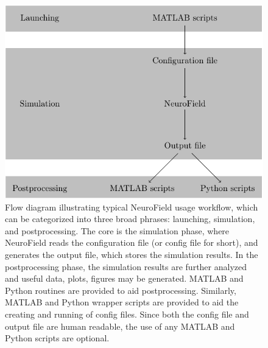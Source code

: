 \documentclass[preprint,review,10pt,authoryear,letterpaper]{elsarticle}
\begin{document}
\begin{figure}[!ht]
\begin{center}
\includegraphics{flow.pdf}
\caption{Flow diagram illustrating typical NeuroField usage workflow, which can be categorized into three broad phrases: launching, simulation, and postprocessing. The core is the simulation phase, where NeuroField reads the configuration file (or config file for short), and generates the output file, which stores the simulation results. In the postprocessing phase, the simulation results are further analyzed and useful data, plots, figures may be generated. MATLAB and Python routines are provided to aid postprocessing. Similarly, MATLAB and Python wrapper scripts are provided to aid the creating and running of config files. Since both the config file and output file are human readable, the use of any MATLAB and Python scripts are optional.}
\end{center}
\end{figure}

\end{document}
